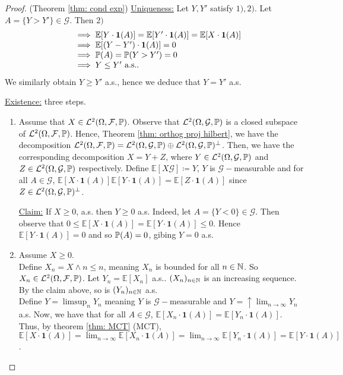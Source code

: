 \documentclass{article}
\begin{document}
\begin{proof}{(Theorem \ref{thm: cond exp})}
	\underline{Uniqueness:} Let $ Y, Y'$ satisfy $ 1), 2)$. Let $ A = \{Y > Y'\}\in\mathcal{G}$. Then $ 2) $  
	\[\begin{array}{ll}
	&\implies \mathbb{E}[Y\cdot\mathbf{1}(A)] =\mathbb{E}[Y'\cdot\mathbf{1}(A)]=\mathbb{E}[X\cdot\mathbf{1}(A)] \\
	&\implies\mathbb{E}[(Y-Y')\cdot\mathbf{1}(A)] = 0\\ 
	&\implies \mathbb{P}(A) = \mathbb{P}(Y>Y') = 0\\ 
	&\implies Y\leq Y' \text{ a.s.}.
	\end{array}
	\]
	We similarly obtain $ Y\geq Y'$ a.s., hence we deduce that $ Y = Y'$ a.s.

	\underline{Existence:} three steps. 
	\begin{enumerate}
		\item Assume that $ X \in\mathcal{L}^{2}(\Omega, \mathcal{F}, \mathbb{P})$. Observe that $\mathcal{L}^{2}(\Omega,\mathcal{G},\mathbb{P})$ is a closed subspace of $\mathcal{L}^{2}(\Omega, \mathcal{F}, \mathbb{P})$. Hence, Theorem \ref{thm: orthog proj hilbert}, we have the decomposition  $\mathcal{L}^{2}(\Omega, \mathcal{F}, \mathbb{P}) =\mathcal{L}^{2}(\Omega,\mathcal{G}, \mathbb{P})\oplus\mathcal{L}^{2}(\Omega,\mathcal{G}, \mathbb{P})^{\perp}$.
Then, we have the corresponding decomposition $ X = Y+Z$, where $ Y\in \mathcal{L}^{2}(\Omega,\mathcal{G}, \mathbb{P})$ and $ Z\in \mathcal{L}^{2}(\Omega,\mathcal{G}, \mathbb{P}) $ respectively. Define $\mathbb{E}[X\mathcal{G}]\coloneqq Y$, $ Y$ is $\mathcal{G}-$measurable and for all $ A\in\mathcal{G}$, $\mathbb{E}[X\cdot\mathbf{1}(A)]\mathbb{E}[Y\cdot\mathbf{1}(A)]=\mathbb{E}[Z\cdot\mathbf{1}(A)]$ since $ Z\in  \mathcal{L}^{2}(\Omega,\mathcal{G}, \mathbb{P})^{\perp}$.

\underline{Claim:} If $ X \geq 0$, a.s. then $ Y \geq 0$ a.s.
Indeed, let $ A = \{Y< 0\}\in\mathcal{G}$. Then observe that $ 0\leq\mathbb{E}[X\cdot\mathbf{1}(A)]=\mathbb{E}[Y\cdot\mathbf{1}(A)]\leq 0$. Hence $\mathbb{E}[Y\cdot\mathbf{1}(A)]=0$ and so $ \mathbb{P}(A) = 0$, gibing $ Y = 0$ a.s.

\item Assume $ X\geq 0 $.\\ 
	Define $ X_{n} = X\land n\leq n $, meaning $ X_{n}$ is bounded for all $ n\in \mathbb{N}$. So $ X_{n}\in\mathcal{L}^{2}(\Omega, \mathcal{F}, \mathbb{P})$. Let $ Y_{n} =\mathbb{E}[X_{n}]$ a.s.. $ (X_{n})_{n\in \mathbb{N}}$ is an increasing sequence. By the claim above, so is $ (Y_{n})_{n\in \mathbb{N}}$ a.s.\\
	Define $ Y = \displaystyle \limsup_{n}Y_{n}$ meaning $ Y$ is $\mathcal{G}-$measurable and $ Y = \uparrow \displaystyle \lim_{n\to \infty}Y_{n} $ a.s. Now, we have that for all $ A\in\mathcal{G}$, $\mathbb{E}[X_{n}\cdot\mathbf{1}(A)] =\mathbb{E}[Y_{n}\cdot\mathbf{1}(A)]$. Thus, by theorem \ref{thm: MCT} (MCT), $\mathbb{E}[X\cdot\mathbf{1}(A)]= \displaystyle \lim_{n\to \infty} \mathbb{E}[X_{n}\cdot\mathbf{1}(A)] = \displaystyle \lim_{n\to \infty} \mathbb{E}[Y_{n}\cdot\mathbf{1}(A)] =\mathbb{E}[Y\cdot\mathbf{1}(A)]$.


\end{enumerate}
\end{proof}
\end{document}
